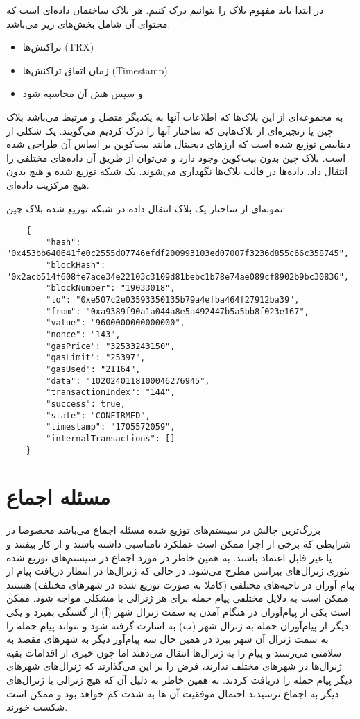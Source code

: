 \documentclass[10pt, a4paper]{article}
\begin{document}
در ابتدا باید مفهوم بلاک را بتوانیم درک کنیم. هر بلاک ساختمان داده‌ای است که
محتوای آن شامل بخش‌های زیر می‌باشد:

\begin{itemize}
    \item تراکنش‌ها (TRX)
    \item زمان اتفاق تراکنش‌ها (Timestamp)
    \item و سپس هش آن محاسبه شود
\end{itemize}

به مجموعه‌ای از این بلاک‌ها که اطلاعات آنها به یکدیگر متصل و مرتبط می‌باشد بلاک
چین یا زنجیره‌ای از بلاک‌هایی که ساختار آنها را درک کردیم می‌گویند. یک شکلی از
دیتابیس توزیع شده است که ارز‌های دیجیتال مانند بیت‌کوین بر اساس آن طراحی شده
است. بلاک چین بدون بیت‌کوین وجود دارد و می‌توان از طریق آن داده‌های مختلفی را
انتقال داد. داده‌ها در قالب بلاک‌ها نگهداری می‌شوند. یک شبکه توزیع شده و هیچ
بدون هیچ مرکزیت داده‌ای.

نمونه‌ای از ساختار یک بلاک انتقال داده در شبکه توزیع شده بلاک چین:

\begin{LTR}
    \begin{lstlisting}
    {
        "hash": "0x453bb640641fe0c2555d07746efdf200993103ed07007f3236d855c66c358745",
        "blockHash": "0x2acb514f608fe7ace34e22103c3109d81bebc1b78e74ae089cf8902b9bc30836",
        "blockNumber": "19033018",
        "to": "0xe507c2e03593350135b79a4efba464f27912ba39",
        "from": "0xa9389f90a1a044a8e5a492447b5a5bb8f023e167",
        "value": "9600000000000000",
        "nonce": "143",
        "gasPrice": "32533243150",
        "gasLimit": "25397",
        "gasUsed": "21164",
        "data": "1020240118100046276945",
        "transactionIndex": "144",
        "success": true,
        "state": "CONFIRMED",
        "timestamp": "1705572059",
        "internalTransactions": []
    }
    \end{lstlisting}
\end{LTR}

\section{مسئله اجماع}

بزرگ‌ترین چالش در سیستم‌های توزیع شده مسئله اجماع می‌باشد مخصوصا در شرایطی که
برخی از اجزا ممکن است عملکرد نامناسبی داشته باشند و از کار بیفتند و یا غیر قابل
اعتماد باشند. به همین خاطر در مورد اجماع در سیستم‌های توزیع شده تئوری ژنرال‌های
بیزانس مطرح می‌شود. در حالی که ژنرال‌ها در انتظار دریافت پیام از پیام آوران در
ناحیه‌های مختلفی (کاملا به صورت توزیع شده در شهر‌های مختلف) هستند ممکن است به
دلایل مختلفی پیام حمله برای هر ژنرالی با مشکلی مواجه شود. ممکن است یکی از
پیام‌آوران در هنگام آمدن به سمت ژنرال شهر (آ) از گشنگی بمیرد و یکی دیگر از
پیام‌آوران حمله به ژنرال شهر (ب) به اسارت گرفته شود و نتواند پیام حمله را به سمت
ژنرال آن شهر ببرد در همین حال سه پیام‌آور دیگر به شهر‌های مقصد به سلامتی می‌رسند
و پیام را به ژنرال‌ها انتقال می‌دهند اما چون خبری از اقدامات بقیه ژنرال‌ها در
شهر‌های مختلف ندارند، فرض را بر این می‌گذارند که ژنرال‌های شهر‌های دیگر پیام
حمله را دریافت کردند. به همین خاطر به دلیل آن که هیچ ژنرالی با ژنرال‌های دیگر به
اجماع نرسیدند احتمال موفقیت آن ها به شدت کم خواهد بود و ممکن است شکست خورند.
\end{document}
